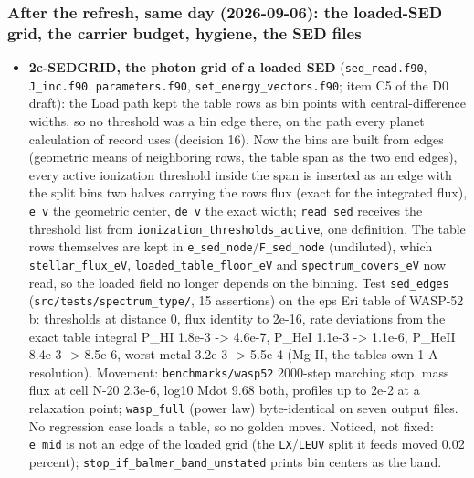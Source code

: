 \documentclass[english,a4paper]{my_memo}
\providecommand{\tightlist}{\setlength{\itemsep}{0pt}\setlength{\parskip}{0pt}}
\begin{document}
\subsubsection{After the refresh, same day (2026-09-06): the loaded-SED grid, the carrier budget, hygiene, the SED files}\label{after-the-refresh-same-day-2026-09-06-the-loaded-sed-grid-the-carrier-budget-hygiene-the-sed-files}

\begin{itemize}
\tightlist
\item
  \textbf{2c-SEDGRID, the photon grid of a loaded SED} (\texttt{sed\_read.f90}, \texttt{J\_inc.f90},
  \texttt{parameters.f90}, \texttt{set\_energy\_vectors.f90}; item C5 of the D0 draft): the
  Load path kept the table rows as bin points with central-difference
  widths, so no threshold was a bin edge there, on the path every planet
  calculation of record uses (decision 16). Now the bins are built from
  edges (geometric means of neighboring rows, the table span as the two
  end edges), every active ionization threshold inside the span is inserted
  as an edge with the split bin\textquotesingle s two halves carrying the row\textquotesingle s flux (exact
  for the integrated flux), \texttt{e\_v} the geometric center, \texttt{de\_v} the exact
  width; \texttt{read\_sed} receives the threshold list from
  \texttt{ionization\_thresholds\_active}, one definition. The table rows themselves
  are kept in \texttt{e\_sed\_node}/\texttt{F\_sed\_node} (undiluted), which \texttt{stellar\_flux\_eV},
  \texttt{loaded\_table\_floor\_eV} and \texttt{spectrum\_covers\_eV} now read, so the loaded
  field no longer depends on the binning. Test \texttt{sed\_edges}
  (\texttt{src/tests/spectrum\_type/}, 15 assertions) on the eps Eri table of
  WASP-52 b: thresholds at distance 0, flux identity to 2e-16, rate
  deviations from the exact table integral P\_HI 1.8e-3 -\textgreater{} 4.6e-7, P\_HeI
  1.1e-3 -\textgreater{} 1.1e-6, P\_HeII 8.4e-3 -\textgreater{} 8.5e-6, worst metal 3.2e-3 -\textgreater{} 5.5e-4
  (Mg II, the table\textquotesingle s own 1 A resolution). Movement: \texttt{benchmarks/wasp52}
  2000-step marching stop, mass flux at cell N-20 2.3e-6, log10 Mdot 9.68
  both, profiles up to 2e-2 at a relaxation point; \texttt{wasp\_full} (power law)
  byte-identical on seven output files. No regression case loads a table,
  so no golden moves. Noticed, not fixed: \texttt{e\_mid} is not an edge of the
  loaded grid (the \texttt{LX}/\texttt{LEUV} split it feeds moved 0.02 percent);
  \texttt{stop\_if\_balmer\_band\_unstated} prints bin centers as the band.

\end{itemize}
\end{document}
